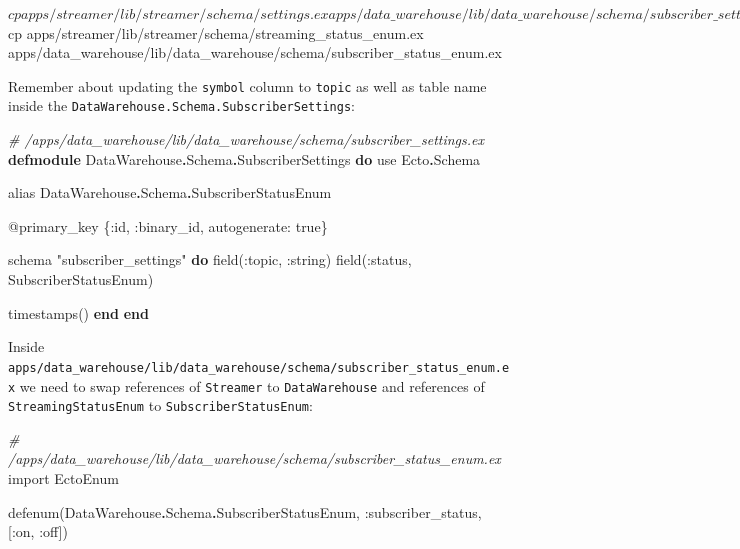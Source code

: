 \documentclass[
]{book}
\newenvironment{Shaded}{\begin{snugshade}}{\end{snugshade}}
\newcommand{\CommentTok}[1]{\textcolor[rgb]{0.56,0.35,0.01}{\textit{#1}}}
\newcommand{\ConstantTok}[1]{\textcolor[rgb]{0.00,0.00,0.00}{#1}}
\newcommand{\ExtensionTok}[1]{#1}
\newcommand{\ImportTok}[1]{#1}
\newcommand{\KeywordTok}[1]{\textcolor[rgb]{0.13,0.29,0.53}{\textbf{#1}}}
\newcommand{\NormalTok}[1]{#1}
\newcommand{\OperatorTok}[1]{\textcolor[rgb]{0.81,0.36,0.00}{\textbf{#1}}}
\newcommand{\OtherTok}[1]{\textcolor[rgb]{0.56,0.35,0.01}{#1}}
\newcommand{\StringTok}[1]{\textcolor[rgb]{0.31,0.60,0.02}{#1}}
\newcommand{\VariableTok}[1]{\textcolor[rgb]{0.00,0.00,0.00}{#1}}
\begin{document}
\begin{Shaded}
\begin{Highlighting}[]
\ExtensionTok{$}\NormalTok{ cp apps/streamer/lib/streamer/schema/settings.ex apps/data\_warehouse/lib/data\_warehouse/schema/subscriber\_settings.ex}
\ExtensionTok{$}\NormalTok{ cp apps/streamer/lib/streamer/schema/streaming\_status\_enum.ex apps/data\_warehouse/lib/data\_warehouse/schema/subscriber\_status\_enum.ex}
\end{Highlighting}
\end{Shaded}

Remember about updating the \texttt{symbol} column to \texttt{topic} as well as table name inside the \texttt{DataWarehouse.Schema.SubscriberSettings}:

\begin{Shaded}
\begin{Highlighting}[]
\CommentTok{\# /apps/data\_warehouse/lib/data\_warehouse/schema/subscriber\_settings.ex}
\KeywordTok{defmodule} \ConstantTok{DataWarehouse}\OperatorTok{.}\ConstantTok{Schema}\OperatorTok{.}\ConstantTok{SubscriberSettings} \KeywordTok{do}
  \ImportTok{use} \ConstantTok{Ecto}\OperatorTok{.}\ConstantTok{Schema}

  \ImportTok{alias} \ConstantTok{DataWarehouse}\OperatorTok{.}\ConstantTok{Schema}\OperatorTok{.}\ConstantTok{SubscriberStatusEnum}

  \OtherTok{@primary\_key}\NormalTok{ \{}\VariableTok{:id}\NormalTok{, }\VariableTok{:binary\_id}\NormalTok{, }\VariableTok{autogenerate:} \ConstantTok{true}\NormalTok{\}}

\NormalTok{  schema }\StringTok{"subscriber\_settings"} \KeywordTok{do}
\NormalTok{    field(}\VariableTok{:topic}\NormalTok{, }\VariableTok{:string}\NormalTok{)}
\NormalTok{    field(}\VariableTok{:status}\NormalTok{, }\ConstantTok{SubscriberStatusEnum}\NormalTok{)}

\NormalTok{    timestamps()}
  \KeywordTok{end}
\KeywordTok{end}
\end{Highlighting}
\end{Shaded}

Inside \texttt{apps/data\_warehouse/lib/data\_warehouse/schema/subscriber\_status\_enum.ex} we need to swap references of \texttt{Streamer} to \texttt{DataWarehouse} and references of \texttt{StreamingStatusEnum} to \texttt{SubscriberStatusEnum}:

\begin{Shaded}
\begin{Highlighting}[]
\CommentTok{\# /apps/data\_warehouse/lib/data\_warehouse/schema/subscriber\_status\_enum.ex}
\ImportTok{import} \ConstantTok{EctoEnum}

\NormalTok{defenum(}\ConstantTok{DataWarehouse}\OperatorTok{.}\ConstantTok{Schema}\OperatorTok{.}\ConstantTok{SubscriberStatusEnum}\NormalTok{, }\VariableTok{:subscriber\_status}\NormalTok{, [}\VariableTok{:on}\NormalTok{, }\VariableTok{:off}\NormalTok{])}
\end{Highlighting}
\end{Shaded}
\end{document}
